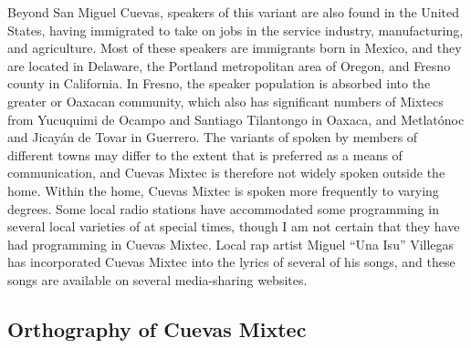 \documentclass[output=paper,modfonts,nonflat]{langsci/langscibook}
\begin{document}
Beyond San Miguel Cuevas, speakers of this variant are also found in the United States, having immigrated to take on jobs in the service industry, manufacturing, and agriculture.  Most of these speakers are immigrants born in Mexico, and they are  located in Delaware, the Portland metropolitan area of Oregon, and Fresno county in California.  In Fresno, the speaker population is absorbed into the greater  or Oaxacan community, which also has significant numbers of Mixtecs from Yucuquimi de Ocampo and Santiago Tilantongo in Oaxaca, and Metlat\'onoc and Jicay\'an de Tovar in Guerrero.  The variants of  spoken by members of different towns may differ to the extent that  is preferred as a means of communication, and Cuevas Mixtec is therefore not widely spoken outside the home.  Within the home, Cuevas Mixtec is spoken more frequently to varying degrees.  Some local radio stations have accommodated some programming in several local varieties of  at special times, though I am not certain that they have had programming in Cuevas Mixtec.  Local rap artist Miguel ``Una Isu'' Villegas has incorporated Cuevas Mixtec into the lyrics of several of his songs, and these songs are available on several media-sharing websites.

\subsection{Orthography of Cuevas Mixtec} \label{sec:cisneros:3.2}
\end{document}
